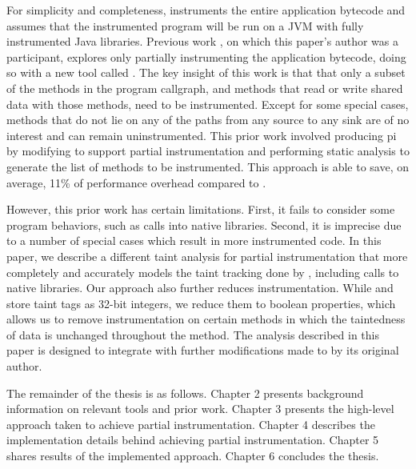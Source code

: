For simplicity and completeness, \phosphor{} instruments the entire
application bytecode and assumes that the instrumented program will be
run on a JVM with fully instrumented Java libraries. Previous work
\cite{manoj_project}, on which this paper's author was a participant,
explores only partially instrumenting the application bytecode, doing
so with a new tool called \phosphorpi{}. The key insight of this work
is that that only a subset of the methods in the program callgraph,
and methods that read or write shared data with those methods, need to
be instrumented. Except for some special cases, methods that do not
lie on any of the paths from any source to any sink are of no interest
and can remain uninstrumented. This prior work involved producing
\phosphor{}pi by modifying \phosphor{} to support partial
instrumentation and performing static analysis to generate the list of
methods to be instrumented. This approach is able to save, on average,
11\% of performance overhead compared to \phosphor{}.

However, this prior work has certain limitations. First, it fails to
consider some program behaviors, such as calls into native
libraries. Second, it is imprecise due to a number of special cases
which result in more instrumented code. In this paper, we describe a
different taint analysis for partial instrumentation that more
completely and accurately models the taint tracking done by
\phosphor{}, including calls to native libraries. Our approach also
further reduces instrumentation. While \phosphor{} and \phosphorpi{}
store taint tags as 32-bit integers, we reduce them to boolean
properties, which allows us to remove instrumentation on certain
methods in which the taintedness of data is unchanged throughout the
method. The analysis described in this paper is designed to integrate
with further modifications made to \phosphor{} by its original author.

The remainder of the thesis is as follows. Chapter 2 presents
background information on relevant tools and prior work. Chapter 3
presents the high-level approach taken to achieve partial
instrumentation. Chapter 4 describes the implementation details behind
achieving partial instrumentation. Chapter 5 shares results of the
implemented approach. Chapter 6 concludes the thesis.
